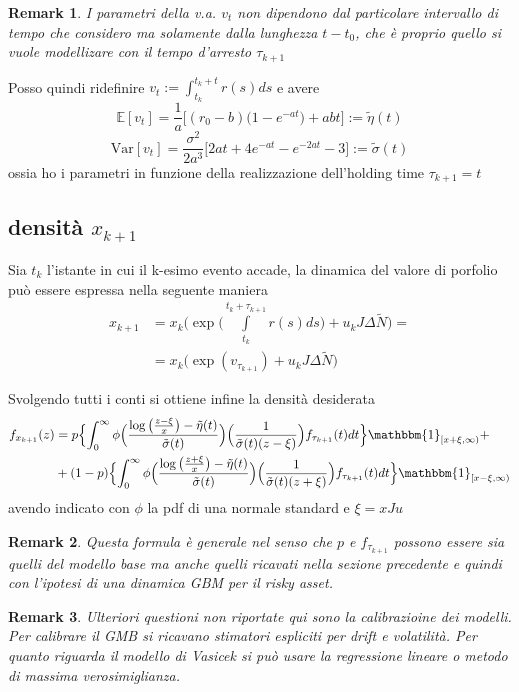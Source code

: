 \documentclass[12pt,a4paper]{article}
\theoremstyle{break}
\newtheorem{remark}{Remark}
\begin{document}
\begin{remark}
	I parametri della v.a. $v_t$  non dipendono dal particolare intervallo di tempo che considero ma solamente dalla lunghezza $t-t_0$, che è proprio quello si vuole modellizare con il tempo d'arresto $\tau_{k+1}$
\end{remark}
Posso quindi ridefinire $v_t := \int_{t_k}^{t_k+t}r(s)ds$ e avere
\[
\mathbb{E}[v_t] = \frac{1}{a}\Big[(r_0 - b)\big(1-e^{-at}\big)+abt\Big] := \tilde{\eta}(t)
\]
\[
\text{Var}[v_t] = \frac{\sigma^2}{2a^3}\Big[2at + 4e^{-at}-e^{-2at}-3\Big] := \tilde{\sigma}(t)
\]
ossia ho i parametri in funzione della realizzazione dell'holding time $\tau_{k+1} = t$

\subsection{densità $x_{k+1}$}

Sia $t_k$ l'istante in cui il k-esimo evento accade, la dinamica del valore di porfolio può essere espressa nella seguente maniera
\begin{align*}
x_{k+1} & = x_k \Big(\exp\big(\int\limits_{t_k}^{t_k+\tau_{k+1}}r(s)ds\big) + u_k J \Delta\widetilde{N}\Big) = \\
& = x_k \Big(\exp(v_{\tau_{k+1}}) + u_k J \Delta\widetilde{N}\Big)
\end{align*}

Svolgendo tutti i conti si ottiene infine la densità desiderata 
\begin{align}
f_{x_{k+1}}(z) &= p\Bigl\{ \int_{0}^{\infty}\phi\Big(\frac{\log\big(\frac{z-\xi}{x}\big)-\tilde{\eta}(t)}{\tilde{\sigma}(t)}\Big)  \Big(\frac{1}{\tilde{\sigma}(t)(z-\xi)}\Big)f_{\tau_{k+1}}(t)dt\Bigr\}\mathbbm{1}_{[x+\xi,\infty)} \nonumber +\\
& + (1-p)\Bigl\{ \int_{0}^{\infty}\phi\Big(\frac{\log\big(\frac{z+\xi}{x}\big)-\tilde{\eta}(t)}{\tilde{\sigma}(t)}\Big)  \Big(\frac{1}{\tilde{\sigma}(t)(z+\xi)}\Big)f_{\tau_{k+1}}(t)dt\Bigr\}\mathbbm{1}_{[x-\xi,\infty)}
\end{align}
avendo indicato con $\phi$ la pdf di una normale standard e $\xi= xJu$
\begin{remark}
	Questa formula è generale nel senso che $p$ e $f_{\tau_{k+1}}$ possono essere sia quelli del modello base ma anche quelli ricavati nella sezione precedente e quindi con l'ipotesi di una dinamica GBM per il risky asset.
\end{remark}

\begin{remark}
	Ulteriori questioni non riportate qui sono la calibrazioine dei modelli. Per calibrare il GMB si ricavano stimatori espliciti per drift e volatilità. Per quanto riguarda il modello di Vasicek si può usare la regressione lineare o metodo di massima verosimiglianza.
\end{remark}
\end{document}
